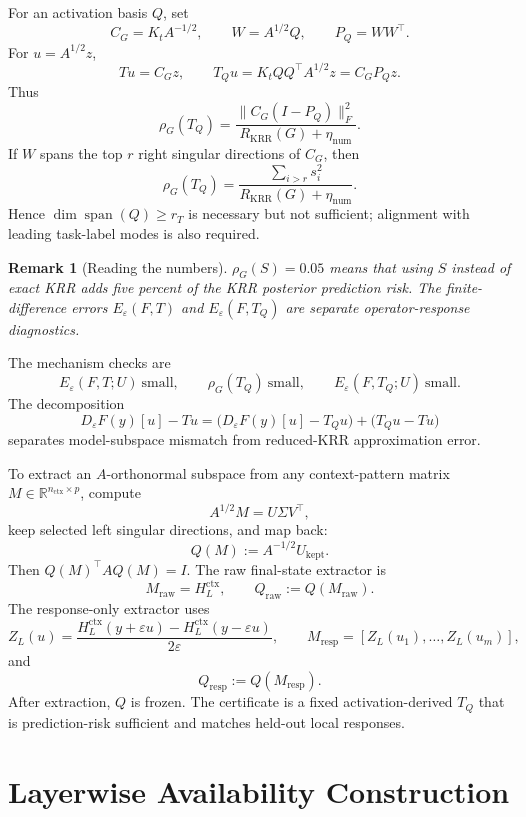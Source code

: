 \documentclass[11pt]{article}
\newtheorem{remark}{Remark}
\newcommand{\R}{\mathbb{R}}
\newcommand{\spanop}{\operatorname{span}}
\begin{document}
For an activation basis \(Q\), set
\[
C_G=K_tA^{-1/2},\qquad W=A^{1/2}Q,\qquad P_Q=WW^\top .
\]
For \(u=A^{1/2}z\),
\[
Tu=C_Gz,\qquad
T_Qu=K_tQQ^\top A^{1/2}z=C_GP_Qz.
\]
Thus
\[
\rho_G(T_Q)
=
\frac{\|C_G(I-P_Q)\|_F^2}{R_{\mathrm{KRR}}(G)+\eta_{\mathrm{num}}}.
\]
If \(W\) spans the top \(r\) right singular directions of \(C_G\), then
\[
\rho_G(T_Q)
=
\frac{\sum_{i>r}s_i^2}{R_{\mathrm{KRR}}(G)+\eta_{\mathrm{num}}}.
\]
Hence \(\dim\spanop(Q)\ge r_T\) is necessary but not sufficient; alignment with leading
task-label modes is also required.

\begin{remark}[Reading the numbers]
\(\rho_G(S)=0.05\) means that using \(S\) instead of exact KRR adds five percent of the KRR
posterior prediction risk. The finite-difference errors \(E_\varepsilon(F,T)\) and
\(E_\varepsilon(F,T_Q)\) are separate operator-response diagnostics.
\end{remark}

The mechanism checks are
\[
E_\varepsilon(F,T;U)\ \text{small},
\qquad
\rho_G(T_Q)\ \text{small},
\qquad
E_\varepsilon(F,T_Q;U)\ \text{small}.
\]
The decomposition
\[
D_\varepsilon F(y)[u]-Tu
=
\bigl(D_\varepsilon F(y)[u]-T_Qu\bigr)
+
\bigl(T_Qu-Tu\bigr)
\]
separates model-subspace mismatch from reduced-KRR approximation error.

To extract an \(A\)-orthonormal subspace from any context-pattern matrix
\(M\in\R^{n_{\mathrm{ctx}}\times p}\), compute
\[
A^{1/2}M=U\Sigma V^\top,
\]
keep selected left singular directions, and map back:
\[
Q(M):=A^{-1/2}U_{\mathrm{kept}}.
\]
Then \(Q(M)^\top A Q(M)=I\). The raw final-state extractor is
\[
M_{\mathrm{raw}}=H_L^{\mathrm{ctx}},
\qquad
Q_{\mathrm{raw}}:=Q(M_{\mathrm{raw}}).
\]
The response-only extractor uses
\[
Z_L(u)=
\frac{
H_L^{\mathrm{ctx}}(y+\varepsilon u)-H_L^{\mathrm{ctx}}(y-\varepsilon u)
}{2\varepsilon},
\qquad
M_{\mathrm{resp}}=[Z_L(u_1),\ldots,Z_L(u_m)],
\]
and
\[
Q_{\mathrm{resp}}:=Q(M_{\mathrm{resp}}).
\]
After extraction, \(Q\) is frozen. The certificate is a fixed activation-derived \(T_Q\) that is
prediction-risk sufficient and matches held-out local responses.

\section{Layerwise Availability Construction}
\end{document}
